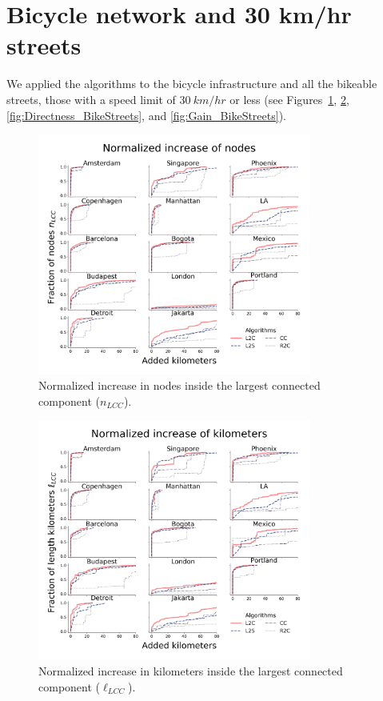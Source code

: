 \section*{Bicycle network and 30 km/hr streets}
We applied the algorithms to the bicycle infrastructure and all the bikeable streets, those with a speed limit of $30\ km/hr$ or less (see Figures~\ref{fig:NodesIncrease_BikeStreets}, \ref{fig:Lengthsncrease_BikeStreets}, \ref{fig:Directness_BikeStreets}, and \ref{fig:Gain_BikeStreets}).

\begin{figure}[h!]
  \centering
  \includegraphics[width=0.8\textwidth]{images/datadriven/SI_Nodes_Bike_Streets.png}
  \caption{Normalized increase in nodes inside the largest connected component ($n_{LCC}$).}
  \label{fig:NodesIncrease_BikeStreets}
\end{figure}

\begin{figure}[h!]
  \centering
  \includegraphics[width=0.8\textwidth]{images/datadriven/SI_Lengths_Bike_Streets.png}
  \caption{Normalized increase in kilometers inside the largest connected component ($\ell_{LCC}$).}
  \label{fig:Lengthsncrease_BikeStreets}
\end{figure}

